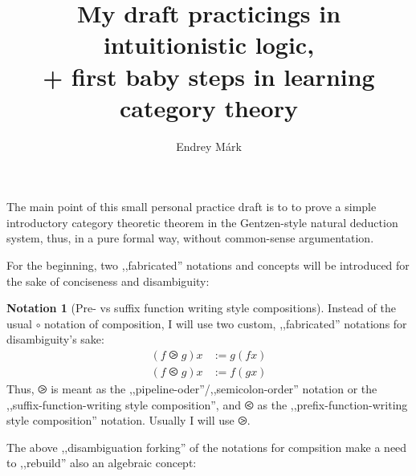 \documentclass{article}
\title{My draft practicings in intuitionistic logic,\\+ first baby steps in learning category theory}
\author{Endrey Márk}
\newcommand{\parenth}[1]{\left(#1\right)}
\theoremstyle{definition}
\newtheorem{ntn}{Notation}
\begin{document}
	\maketitle
	\begin{comment}
		\[
			\infer[(\lor E)_{a,b}]{C}{
				A\lor B&
				\infer*C{
					\infer[a]A{}
				}&
				\infer*C{
					\infer[b]B{}
				}
			}
		\]
	\end{comment}
	The main point of this small personal practice draft is to to prove a simple introductory category theoretic theorem in the Gentzen-style natural deduction system, thus, in a pure formal way, without common-sense argumentation.

	For the beginning, two ,,fabricated'' notations and concepts will be introduced for the sake of conciseness and disambiguity:

	\begin{ntn}[Pre- vs suffix function writing style compositions]
		Instead of the usual $\circ$ notation of composition, I will use two custom, ,,fabricated'' notations for disambiguity's sake:
		\begin{align}
			\parenth{f \ogreaterthan g}x &:= g\parenth{fx}\\
			\parenth{f \olessthan g}x &:= f\parenth{gx}
		\end{align}
		Thus, $\ogreaterthan$ is meant as the ,,pipeline-oder''/,,semicolon-order'' notation or the ,,suffix-function-writing style composition'', and $\olessthan$ as the ,,prefix-function-writing style composition'' notation. Usually I will use $\ogreaterthan$.
	\end{ntn}

	The above ,,disambiguation forking'' of the notations for compsition make a need to ,,rebuild'' also an algebraic concept:
\end{document}
